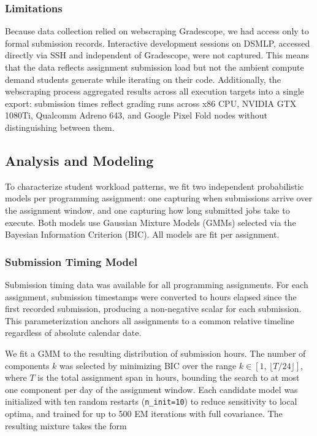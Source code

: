 \documentclass[acmlarge]{acmart}
\begin{document}
\subsubsection{Limitations}
Because data collection relied on webscraping Gradescope, we had access only to formal submission records. Interactive development sessions on DSMLP, accessed directly via SSH and independent of Gradescope, were not captured. This means that the data reflects assignment submission load but not the ambient compute demand students generate while iterating on their code. Additionally, the webscraping process aggregated results across all execution targets into a single export: submission times reflect grading runs across x86 CPU, NVIDIA GTX 1080Ti, Qualcomm Adreno 643, and Google Pixel Fold nodes without distinguishing between them.


\subsection{Analysis and Modeling}
To characterize student workload patterns, we fit two independent
probabilistic models per programming assignment: one capturing when
submissions arrive over the assignment window, and one capturing how
long submitted jobs take to execute. Both models use Gaussian Mixture
Models (GMMs) selected via the Bayesian Information Criterion (BIC).
All models are fit per assignment.
\subsubsection{Submission Timing Model}
 
Submission timing data was available for all programming assignments.
For each assignment, submission timestamps were converted to hours
elapsed since the first recorded submission, producing a non-negative
scalar for each submission. This parameterization anchors all
assignments to a common relative timeline regardless of absolute
calendar date.
 
We fit a GMM to the resulting distribution of submission hours. The
number of components $k$ was selected by minimizing BIC over the range
$k \in [1,\, \lfloor T/24 \rfloor]$, where $T$ is the total
assignment span in hours, bounding the search to at most one component
per day of the assignment window. Each candidate model was initialized
with ten random restarts (\texttt{n\_init=10}) to reduce sensitivity
to local optima, and trained for up to 500 EM iterations with full
covariance. The resulting mixture takes the form
 
\end{document}
